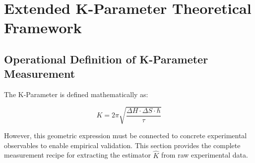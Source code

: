 \documentclass[11pt,a4paper,twoside]{article}
\begin{document}
\section{Extended K-Parameter Theoretical Framework}

\subsection{Operational Definition of K-Parameter Measurement}
\label{sec:operational}

The K-Parameter is defined mathematically as:

\begin{equation}
K = 2\pi\sqrt{\frac{\Delta H \cdot \Delta S \cdot \hbar}{\tau}}
\end{equation}

However, this geometric expression must be connected to concrete experimental observables to enable empirical validation. This section provides the complete measurement recipe for extracting the estimator $\hat{K}$ from raw experimental data.
\end{document}
